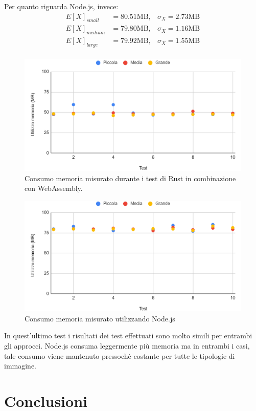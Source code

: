 Per quanto riguarda Node.js, invece:
\begin{align*}
    E[X]_{small}&=80.51\text{MB},  & \sigma_X=2.73\text{MB}\\
    E[X]_{medium}&=79.80\text{MB},  & \sigma_X=1.16\text{MB}\\
    E[X]_{large}&=79.92\text{MB},  & \sigma_X=1.55\text{MB}\\
\end{align*}
\begin{figure}
    \begin{center}
            \includegraphics[width=1\columnwidth]{images/rust_mem.png}
    \end{center}
    \caption{Consumo memoria misurato durante i test di Rust in combinazione con WebAssembly.}
\end{figure}
\begin{figure}
    \begin{center}
            \includegraphics[width=1\columnwidth]{images/node_mem.png}
    \end{center}
    \caption{Consumo memoria misurato utilizzando Node.js}
\end{figure}
\newpage
In quest'ultimo test i risultati dei test effettuati sono molto simili per entrambi gli approcci. Node.js consuma leggermente più memoria ma in entrambi i casi, tale consumo viene mantenuto pressochè costante per tutte le tipologie di immagine.
\newpage
\section{Conclusioni}